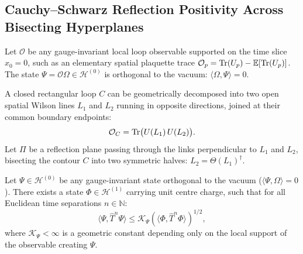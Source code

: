 \subsection{Cauchy--Schwarz Reflection Positivity Across Bisecting Hyperplanes}
\label{subsec:cs_reflection_hyperplanes}

Let $\mathcal{O}$ be any gauge-invariant local loop observable supported on the time slice $x_0 = 0$, such as an elementary spatial plaquette trace $\mathcal{O}_p = \mathrm{Tr}(U_p) - \mathbb{E}[\mathrm{Tr}(U_p)]$. The state $\Psi = \mathcal{O} \Omega \in \mathcal{H}^{(0)}$ is orthogonal to the vacuum: $\langle \Omega, \Psi \rangle = 0$.

A closed rectangular loop $C$ can be geometrically decomposed into two open spatial Wilson lines $L_1$ and $L_2$ running in opposite directions, joined at their common boundary endpoints:
\begin{equation}
\label{eq:ch11_loop_split}
\mathcal{O}_C = \mathrm{Tr}\bigl( U(L_1) \, U(L_2) \bigr).
\end{equation}
Let $\Pi$ be a reflection plane passing through the links perpendicular to $L_1$ and $L_2$, bisecting the contour $C$ into two symmetric halves: $L_2 = \Theta(L_1)^\dagger$.

\begin{theorem}
\label{thm:quadratic_form_domination}
Let $\Psi \in \mathcal{H}^{(0)}$ be any gauge-invariant state orthogonal to the vacuum ($\langle \Psi, \Omega \rangle = 0$). There exists a state $\Phi \in \mathcal{H}^{(1)}$ carrying unit centre charge, such that for all Euclidean time separations $n \in \mathbb{N}$:
\begin{equation}
\label{eq:quadratic_domination_inequality}
\langle \Psi, \hat{T}^n \Psi \rangle \le \mathcal{K}_\Psi \left( \langle \Phi, \hat{T}^n \Phi \rangle \right)^{1/2},
\end{equation}
where $\mathcal{K}_\Psi < \infty$ is a geometric constant depending only on the local support of the observable creating $\Psi$.
\end{theorem}

